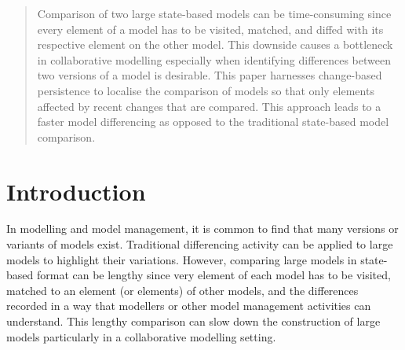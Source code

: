 \documentclass{llncs}
\begin{document}
\begin{abstract}
Comparison of two large state-based models can be time-consuming since every element of a model has to be visited, matched, and diffed with its respective element on the other model. This downside causes a bottleneck in collaborative modelling especially when identifying differences between two versions of a model is desirable. This paper harnesses change-based persistence to localise the comparison of models so that only elements affected by recent changes that are compared. This approach leads to a faster model differencing as opposed to the traditional state-based model comparison. 
\end{abstract}

\vspace{-20pt}
\section{Introduction}
\label{sec:introduction}



In modelling and model management, it is common to find that many versions or variants of models exist. 
Traditional differencing activity can be applied to large models to highlight their variations. However,
comparing large models in state-based format can be lengthy since very element of each model has to be visited, matched to an element (or elements) of other models, and the differences recorded in a way that modellers or other model management activities can understand.
This lengthy comparison can slow down the construction of large models particularly in a collaborative modelling setting. 
\end{document}
